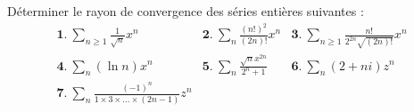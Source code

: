 \documentclass{book}
\begin{document}
\begin{Exercice}
  Déterminer le rayon de convergence des séries entières suivantes :
$$\begin{array}{lll}
\mathbf{1.}\ \sum_{n\geq 1}\frac{1}{\sqrt{n}}x^n&
\mathbf{2.}\ \sum_n\frac{(n!)^2}{(2n)!}x^n&\mathbf{3.}\ \sum_{n\geq 1}  \frac{n!}{2^{2n}\sqrt{(2n)!}}x^n\\
\mathbf {4.}\ \sum_{n}(\ln n) x^n&\mathbf{5.}\ \sum_n\frac{\sqrt nx^{2n}}{2^n+1}&
\mathbf{6.}\ \sum_n(2+ni) z^n\\
\mathbf{7.}\ \sum_n\frac{(-1)^n}{1\times 3\times\dots\times (2n-1)}z^n\\
\end{array}$$
\begin{Correction}
\end{Correction}
\end{Exercice} 
\end{document}
